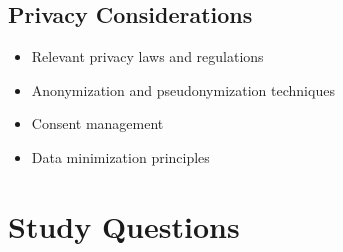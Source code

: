 \documentclass[12pt]{article}
\begin{document}
\subsection{Privacy Considerations}
\begin{itemize}
    \item Relevant privacy laws and regulations
    \item Anonymization and pseudonymization techniques
    \item Consent management
    \item Data minimization principles
\end{itemize}

\section{Study Questions}
\end{document}
